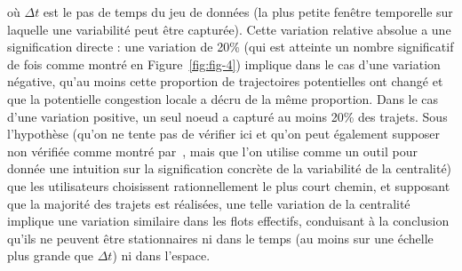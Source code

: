 {où $\Delta t$ est le pas de temps du jeu de données (la plus petite fenêtre temporelle sur laquelle une variabilité peut être capturée). Cette variation relative absolue a une signification directe : une variation de 20\% (qui est atteinte un nombre significatif de fois comme montré en Figure~\ref{fig:fig-4}) implique dans le cas d'une variation négative, qu'au moins cette proportion de trajectoires potentielles ont changé et que la potentielle congestion locale a décru de la même proportion. Dans le cas d'une variation positive, un seul noeud a capturé au moins 20\% des trajets. Sous l'hypothèse (qu'on ne tente pas de vérifier ici et qu'on peut également supposer non vérifiée comme montré par~\cite{zhu2010people}, mais que l'on utilise comme un outil pour donnée une intuition sur la signification concrète de la variabilité de la centralité) que les utilisateurs choisissent rationnellement le plus court chemin, et supposant que la majorité des trajets est réalisées, une telle variation de la centralité implique une variation similaire dans les flots effectifs, conduisant à la conclusion qu'ils ne peuvent être stationnaires ni dans le temps (au moins sur une échelle plus grande que $\Delta t$) ni dans l'espace.
}




